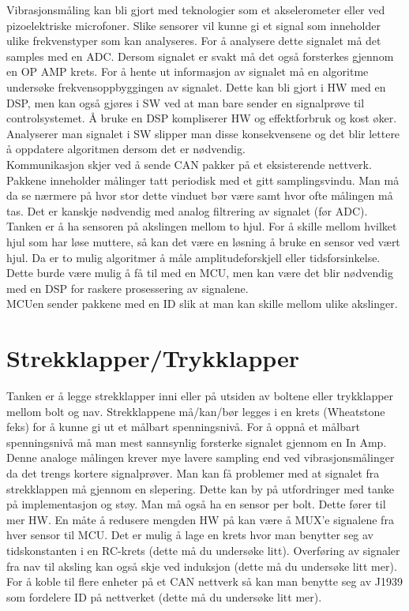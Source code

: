 Vibrasjonsmåling kan bli gjort med teknologier som et akselerometer eller ved
pizoelektriske microfoner. Slike sensorer vil kunne gi et signal som inneholder
ulike frekvenstyper som kan analyseres. For å analysere dette signalet må det
samples med en ADC. Dersom signalet er svakt må det også forsterkes gjennom en
OP AMP krets. For å hente ut informasjon av signalet må en algoritme undersøke
frekvensoppbyggingen av signalet. Dette kan bli gjort i HW med en DSP, men kan
også gjøres i SW ved at man bare sender en signalprøve til controlsystemet. Å
bruke en DSP kompliserer HW og effektforbruk og kost øker. Analyserer man
signalet i SW slipper man disse konsekvensene og det blir lettere å oppdatere
algoritmen dersom det er nødvendig. \\

Kommunikasjon skjer ved å sende CAN pakker på et eksisterende nettverk. Pakkene
inneholder målinger tatt periodisk med et gitt samplingsvindu. Man må da se
nærmere på hvor stor dette vinduet bør være samt hvor ofte målingen må tas. Det
er kanskje nødvendig med analog filtrering av signalet (før ADC). \\

Tanken er å ha sensoren på akslingen mellom to hjul. For å skille mellom hvilket
hjul som har løse muttere, så kan det være en løsning å bruke en sensor ved vært
hjul. Da er to mulig algoritmer å måle amplitudeforskjell eller
tidsforsinkelse. Dette burde være mulig å få til med en MCU, men kan være det
blir nødvendig med en DSP for raskere prosessering av signalene. \\

MCUen sender pakkene med en ID slik at man kan skille mellom ulike akslinger. \\

\section{Strekklapper/Trykklapper}

Tanken er å legge strekklapper inni eller på utsiden av boltene eller
trykklapper mellom bolt og nav. Strekklappene
må/kan/bør legges i en krets (Wheatstone feks) for å kunne gi ut et målbart
spenningsnivå. For å oppnå et målbart spenningsnivå må man mest sannsynlig
forsterke signalet gjennom en In Amp. Denne analoge målingen krever mye lavere sampling end ved
vibrasjonsmålinger da det trengs kortere signalprøver.
Man kan få problemer med at signalet fra strekklappen må gjennom en slepering.
Dette kan by på utfordringer med tanke på implementasjon og støy.
Man må også ha en sensor per bolt. Dette fører til mer HW. En måte å redusere
mengden HW på kan være å MUX'e signalene fra hver sensor til MCU. Det er mulig å lage
en krets hvor man benytter seg av tidskonstanten i en RC-krets (dette må du
undersøke litt). Overføring av
signaler fra nav til aksling kan også skje ved induksjon (dette må du undersøke
litt mer). For å koble til flere
enheter på et CAN nettverk så kan man benytte seg av J1939 som fordelere ID på
nettverket (dette må du undersøke litt mer). 
